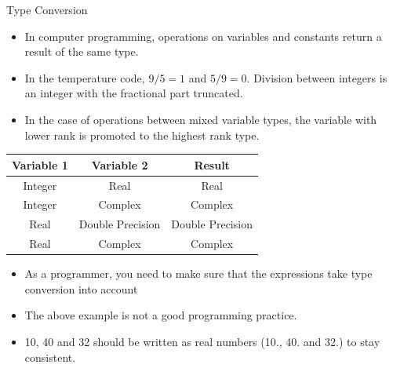\documentclass[c,mathserif,compress,xcolor=svgnames]{beamer}
\newenvironment{eblock}[0]
{
\begin{beamerboxesrounded}[upper=uppercol2,lower=lowercol2,shadow=true]}
{\end{beamerboxesrounded}}
\begin{document}
\begin{frame}{Type Conversion}
  \begin{itemize}
    \item In computer programming, operations on variables and constants return a result of the same type.
    \item In the temperature code, $9/5=1$ and $5/9=0$. Division between integers is an integer with the fractional part truncated.
    \item In the case of operations between mixed variable types, the variable with lower rank is promoted to the highest rank type.
  \end{itemize}
  \begin{eblock}{}
    \begin{center}
      \footnotesize
      \begin{tabular}{ccc}
        \hline
        Variable 1 & Variable 2 & Result \\
        \hline
        Integer & Real & Real \\
        Integer & Complex & Complex \\
        Real & Double Precision & Double Precision \\
        Real & Complex & Complex\\
        \hline
      \end{tabular}
    \end{center}
  \end{eblock}
  \framebreak
  \begin{itemize}
    \item As a programmer, you need to make sure that the expressions take type conversion into account
      \begin{columns}[t]
        Fortran},basicstyle=\fontsize{6}{5}\selectfont\ttfamily]{./Exercise/temp.f90}
        \column{0.6\textwidth}
        \begin{lstlisting}[basicstyle=\fontsize{6}{5}\selectfont\ttfamily]
altair:Exercise apacheco$ gfortran temp.f90
altair:Exercise apacheco$ ./a.out
 10C =    50.0000000     F
 40F =    4.44444466     C
        \end{lstlisting}
      \end{columns}
    \item The above example is not a good programming practice. 
    \item 10, 40 and 32 should be written as real numbers (10., 40. and 32.) to stay consistent. 
  \end{itemize}
\end{frame}
\end{document}
